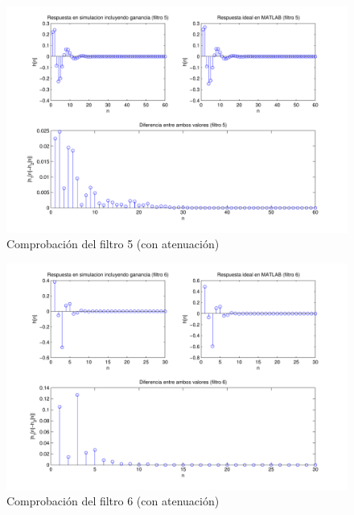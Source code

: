 \documentclass[a4paper,12pt]{article}
\begin{document}
\begin{figure}[hbt]
\includegraphics[width=\textwidth]{img/respfiltro5_gain.pdf} 
\caption{Comprobación del filtro 5 (con atenuación)} \label{fig:filter5_gain}
\end{figure}

\begin{figure}[hbt]
\begin{center}
\includegraphics[width=\textwidth]{img/respfiltro6_gain.pdf} 
\caption{Comprobación del filtro 6 (con atenuación)} \label{fig:filter6_gain}
\end{center}
\end{figure}

\clearpage
\end{document}
